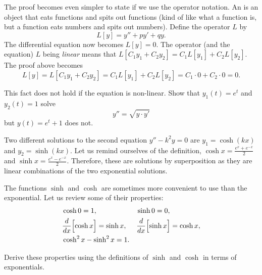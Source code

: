 \documentclass{ximera}
\begin{document}
The proof becomes even simpler to state if we use the operator notation. An \emph{} is an object that eats functions and spits out functions (kind of like what a function is, but a function eats numbers and spits out numbers). Define the operator $L$ by
\begin{equation*}
    L[y] = y'' + py' + qy .
\end{equation*}
The differential equation now becomes $L[y]=0$. The operator (and the equation) $L$ being \emph{linear} means that $L[C_1y_1 + C_2y_2] =  C_1 L[y_1] + C_2 L[y_2]$.  The proof above becomes
\begin{equation*}
    L[y] = L[C_1y_1 + C_2y_2] = C_1 L[y_1] + C_2 L[y_2] = C_1 \cdot 0 + C_2 \cdot 0 = 0 .
\end{equation*}

\begin{exercise}
    This fact does not hold if the equation is non-linear. Show that $y_1(t) = e^t$ and $y_2(t) = 1$ solve 
    \begin{equation*}
        y'' = \sqrt{y\cdot y'}
    \end{equation*}
    but $y(t) = e^t + 1$ does not.
\end{exercise}


Two different solutions to the second equation $y'' - k^2y = 0$ are $y_1 = \cosh (kx)$ and $y_2 = \sinh (kx)$.  Let us remind ourselves of the definition, $\cosh x = \frac{e^x  + e^{-x}}{2}$ and $\sinh x = \frac{e^x - e^{-x}}{2}$.  Therefore, these are solutions by superposition as they are linear combinations of the two exponential solutions.

The functions $\sinh$ and $\cosh$ are sometimes more convenient to use than the exponential.  Let us review some of their properties:
\begin{align*}
    & \cosh 0  = 1 , &   & \sinh 0 = 0 , \\
    & \frac{d}{dx} \Bigl[ \cosh x \Bigr] = \sinh x , &  & \frac{d}{dx} \Bigl[ \sinh x \Bigr] = \cosh x , \\
    & \cosh^2 x - \sinh^2 x = 1 .
\end{align*}


\begin{exercise}
    Derive these properties using the definitions of $\sinh$ and $\cosh$ in terms of exponentials.
\end{exercise}
\end{document}
